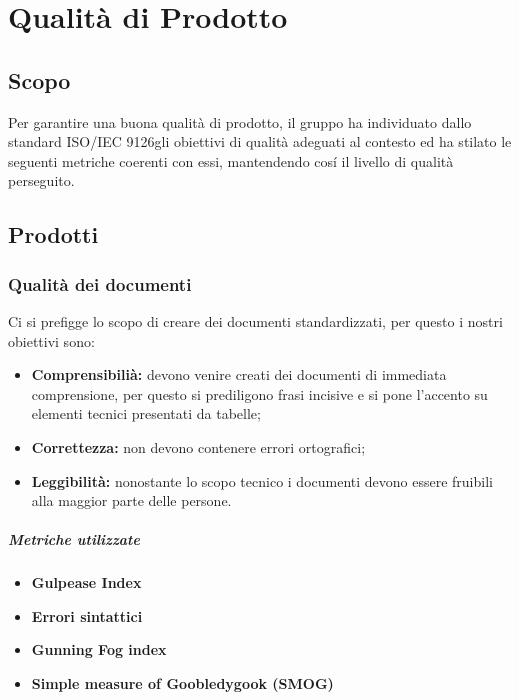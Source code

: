 \section{Qualità di Prodotto}
\subsection{Scopo}
Per garantire una buona qualità di prodotto, il gruppo ha individuato dallo standard ISO/IEC 9126\pedice gli obiettivi di qualità adeguati al contesto ed ha stilato le seguenti metriche coerenti con essi, mantendendo cosí il livello di qualità perseguito.

\subsection{Prodotti}
\subsubsection{Qualità dei documenti}
Ci si prefigge lo scopo di creare dei documenti standardizzati, per questo i nostri obiettivi sono:
\begin{itemize}
	\item{\textbf{Comprensibilià:} devono venire creati dei documenti di immediata comprensione, per questo si prediligono frasi incisive e si pone l'accento su elementi tecnici presentati da tabelle;}
	\item{\textbf{Correttezza:} non devono contenere errori ortografici;}
	\item{\textbf{Leggibilità:} nonostante lo scopo tecnico i documenti devono essere fruibili alla maggior parte delle persone.}
\end{itemize}
\vspace{0.8cm}
\subparagraph{Metriche utilizzate}
\begin{itemize}
	\item{\textbf{Gulpease Index\pedice}}
	\item{\textbf{Errori sintattici}}
	\item{\textbf{Gunning Fog index\pedice}}
	\item{\textbf{Simple measure of Goobledygook (SMOG)\pedice}}
\end{itemize}
